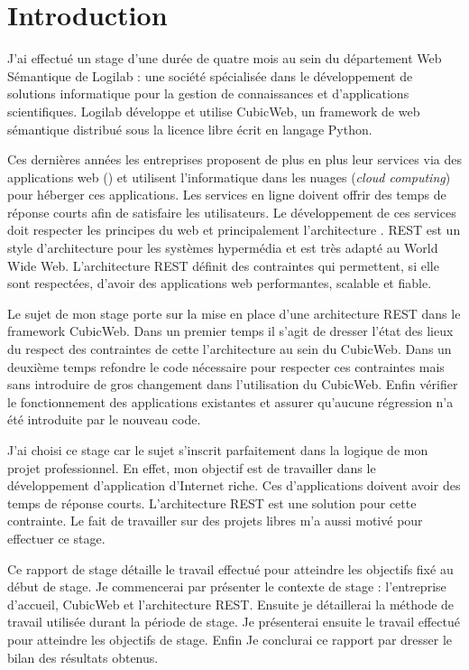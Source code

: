 \chapter*{Introduction}
J'ai effectué un stage d'une durée de quatre mois au sein du département Web Sémantique de Logilab : une société spécialisée dans le développement de solutions informatique pour la gestion de connaissances et d'applications scientifiques. Logilab développe et utilise CubicWeb, un framework de web sémantique distribué sous la licence libre  écrit en langage Python. 

Ces dernières années les entreprises proposent de plus en plus leur services via des applications web (\textit{}) et utilisent l'informatique dans les nuages (\textit{cloud computing}) pour héberger ces applications. Les services en ligne doivent offrir des temps de réponse courts afin de satisfaire les utilisateurs. Le développement de ces services doit respecter les principes du web et principalement l'architecture . REST est un style d'architecture pour les systèmes hypermédia et est très adapté au World Wide Web. L'architecture REST définit des contraintes qui permettent, si elle sont respectées, d'avoir des applications web performantes, scalable et fiable.

Le sujet de mon stage porte sur la mise en place d'une architecture REST dans le framework CubicWeb. Dans un premier temps il s'agit de dresser l'état des lieux du respect des contraintes de cette l'architecture au sein du CubicWeb. Dans un deuxième temps refondre le code nécessaire pour respecter ces contraintes mais sans introduire de gros changement dans l'utilisation du CubicWeb. Enfin vérifier le fonctionnement des applications existantes et assurer qu'aucune régression n'a été introduite par le nouveau code.

J'ai choisi ce stage car le sujet s'inscrit parfaitement dans la logique de mon projet professionnel. En effet, mon objectif est de travailler dans le développement d'application d'Internet riche. Ces d'applications doivent avoir des temps de réponse courts. L'architecture REST est une solution pour cette contrainte. Le fait de travailler sur des projets libres m'a aussi motivé pour effectuer ce stage.

Ce rapport de stage détaille le travail effectué pour atteindre les objectifs fixé au début de stage. Je commencerai par présenter le contexte de stage : l'entreprise d'accueil, CubicWeb et l'architecture REST. Ensuite je détaillerai la méthode de travail utilisée durant la période de stage. Je présenterai ensuite le travail effectué pour atteindre les objectifs de stage. Enfin Je conclurai ce rapport par dresser le bilan des résultats obtenus.